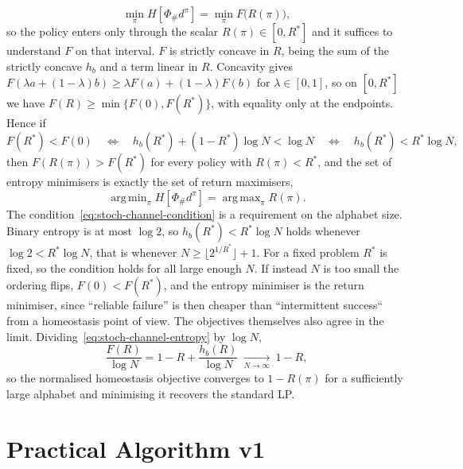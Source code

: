 \documentclass[11pt]{article}
\theoremstyle{remark}
\newcommand{\1}{\mathds{1}}
\newcommand{\occ}{d^{\pi}}
\newcommand{\push}{\Phi_{\#}}
\newcommand{\Hf}[1]{H\!\left[#1\right]}
\DeclareMathOperator*{\argmin}{arg\,min}
\DeclareMathOperator*{\argmax}{arg\,max}
\begin{document}
\begin{equation}
  \min_{\pi}\Hf{\push\occ}=\min_{\pi}F\big(R(\pi)\big),
  \label{eq:stoch-channel-factor}
\end{equation}
so the policy enters only through the scalar $R(\pi)\in[0,R^\ast]$ and it suffices to understand $F$ on that interval.
$F$ is strictly concave in $R$, being the sum of the strictly concave $h_b$ and a term linear in $R$.
Concavity gives $F(\lambda a+(1-\lambda)b)\ge\lambda F(a)+(1-\lambda)F(b)$ for $\lambda\in[0,1]$, so on $[0,R^\ast]$ we have $F(R)\ge\min\{F(0),F(R^\ast)\}$, with equality only at the endpoints.
Hence if
\begin{equation}
  F(R^\ast)<F(0)
  \quad\Longleftrightarrow\quad
  h_b(R^\ast)+(1-R^\ast)\log N<\log N
  \quad\Longleftrightarrow\quad
  h_b(R^\ast)<R^\ast\log N,
  \label{eq:stoch-channel-condition}
\end{equation}
then $F(R(\pi))>F(R^\ast)$ for every policy with $R(\pi)<R^\ast$, and the set of entropy minimisers is exactly the set of return maximisers,
\begin{equation}
  \argmin_{\pi}\Hf{\push\occ}=\argmax_{\pi}R(\pi). \label{eq:homeostasis_lp_equivalence}
\end{equation}
The condition~\eqref{eq:stoch-channel-condition} is a requirement on the alphabet size.
Binary entropy is at most $\log 2$, so $h_b(R^\ast)<R^\ast\log N$ holds whenever $\log 2<R^\ast\log N$, that is whenever $N\ge\lfloor 2^{1/R^\ast} \rfloor +1$.
For a fixed problem $R^\ast$ is fixed, so the condition holds for all large enough $N$.
If instead $N$ is too small the ordering flips, $F(0)<F(R^\ast)$, and the entropy minimiser is the return minimiser, since ``reliable failure'' is then cheaper than ``intermittent success`` from a homeostasis point of view.
The objectives themselves also agree in the limit.
Dividing~\eqref{eq:stoch-channel-entropy} by $\log N$,
\begin{equation}
  \frac{F(R)}{\log N}=1-R+\frac{h_b(R)}{\log N}\ \xrightarrow[N\to\infty]{}\ 1-R,
\end{equation}
so the normalised homeostasis objective converges to $1-R(\pi)$ for a sufficiently large alphabet and minimising it recovers the standard LP.


\section{Practical Algorithm v1}
\label{sec:algorithm}

%
%
\end{document}
